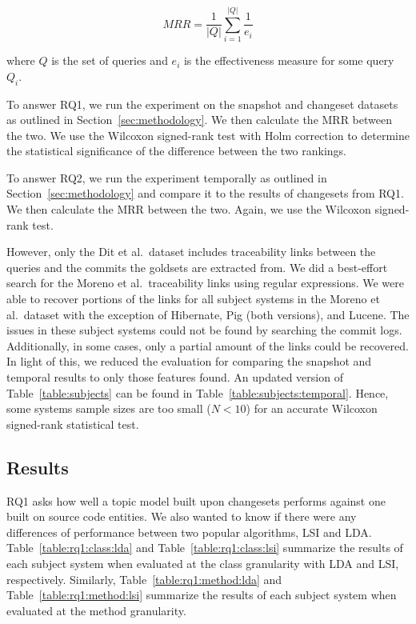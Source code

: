 \begin{equation}
    MRR = \frac{1}{|Q|} \sum_{i=1}^{|Q|} \frac{1}{e_i}
\end{equation}

where $Q$ is the set of queries
and $e_i$ is the effectiveness measure for some query $Q_i$.

To answer RQ1, we run the experiment on the snapshot and changeset
datasets as outlined in Section~\ref{sec:methodology}.
We then calculate the MRR between the two.
We use the Wilcoxon signed-rank test with Holm correction to determine
the statistical significance of the difference between the two rankings.

To answer RQ2, we run the experiment temporally as outlined in Section~\ref{sec:methodology}
and compare it to the results of changesets from RQ1.
We then calculate the MRR between the two.
Again, we use the Wilcoxon signed-rank test.

However, only the Dit et al.\ dataset includes traceability links between
the queries and the commits the goldsets are extracted from.
We did a best-effort search for the Moreno et al.\ traceability links using regular expressions.
We were able to recover portions of the links for all subject systems in
the Moreno et al.\ dataset with the exception of Hibernate, Pig (both versions), and Lucene.
The issues in these subject systems could not be found by searching the commit logs.
Additionally, in some cases, only a partial amount of the links could be
recovered. In light of this, we reduced the evaluation for comparing the
snapshot and temporal results to only those features found.
An updated version of Table~\ref{table:subjects} can be found in Table~\ref{table:subjects:temporal}.
Hence, some systems sample sizes are too small ($N<10$) for an accurate Wilcoxon signed-rank statistical test.




\subsection{Results}







RQ1 asks how well a topic model built upon changesets performs against
one built on source code entities.
We also wanted to know if there were any differences of performance
between two popular algorithms, LSI and LDA.
Table~\ref{table:rq1:class:lda} and Table~\ref{table:rq1:class:lsi}
summarize the results of each subject system when
evaluated at the class granularity with LDA and LSI, respectively.
Similarly, Table~\ref{table:rq1:method:lda} and Table~\ref{table:rq1:method:lsi}
summarize the results of each subject system when
evaluated at the method granularity.

